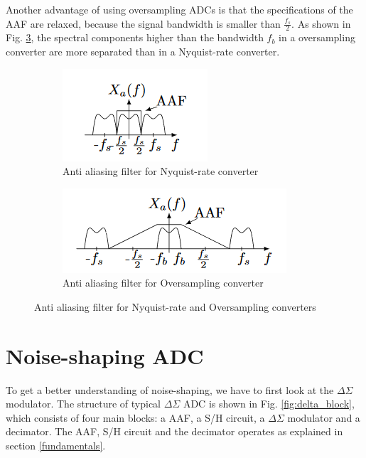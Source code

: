 Another advantage of using oversampling ADCs is that the specifications of the AAF are relaxed, because the signal bandwidth is smaller than $\frac{f_s}{2}$. As shown in Fig. \ref{fig:AAF}, the spectral components higher than the bandwidth $f_b$ in a oversampling converter are more separated than in a Nyquist-rate converter. 

\begin{figure}
\centering
\begin{subfigure}[b]{0.35\textwidth}
   \includegraphics[width=1\linewidth]{images/nyquist_aaf.png}
   \caption{Anti aliasing filter for Nyquist-rate converter}
   \label{fig:AAf_NQ} 
\end{subfigure}

\begin{subfigure}[b]{0.55\textwidth}
   \includegraphics[width=1\linewidth]{images/over_aaf.png}
   \caption{Anti aliasing filter for Oversampling converter}
   \label{fig:AAF_OV}
\end{subfigure}

\caption{Anti aliasing filter for Nyquist-rate and Oversampling converters}
\label{fig:AAF}
\end{figure}

\section{Noise-shaping ADC}
To get a better understanding of noise-shaping, we have to first look at the $\Delta\Sigma$ modulator. The structure of typical $\Delta\Sigma$ ADC is shown in Fig. \ref{fig:delta_block}, which consists of four main blocks: a AAF, a S/H circuit, a $\Delta\Sigma$ modulator and a decimator. The AAF, S/H circuit and the decimator operates as explained in section \ref{fundamentals}.

